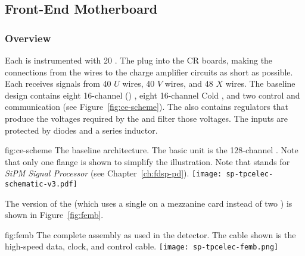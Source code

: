 \subsection{Front-End Motherboard}
\label{sec:fdsp-tpcelec-design-femb}

\subsubsection{Overview}
\label{sec:fdsp-tpcelec-design-femb-overview}

Each  is instrumented with \num{20} .
The  plug into the  CR boards, making the connections from the wires to the charge amplifier circuits as short as possible.
Each  receives signals from \num{40} $U$ wires, \num{40} $V$ wires, and \num{48} $X$ wires.
The baseline  design contains eight \num{16}-channel  () , eight \num{16}-channel Cold  , and two  control and communication  (see Figure~\ref{fig:ce-scheme}).
The  also contains regulators that produce the voltages required by the  and 
filter those voltages.
The  inputs are protected by diodes and a series inductor.

\begin{dunefigure}
{fig:ce-scheme}
{The baseline  architecture. The basic unit is the \num{128}-channel . Note that only one  flange is shown to simplify the illustration. Note that  stands for \textit{SiPM Signal Processor} (see Chapter~\ref{ch:fdsp-pd}).}
\texttt{[image: sp-tpcelec-schematic-v3.pdf]}
\end{dunefigure}

The  version of the  (which uses a single  on a mezzanine card instead of two  ) is shown in Figure~\ref{fig:femb}.

\begin{dunefigure}
{fig:femb}
{The complete  assembly as used in the  detector. The cable shown is the high-speed data, clock, and control cable.}
\texttt{[image: sp-tpcelec-femb.png]}
\end{dunefigure}

